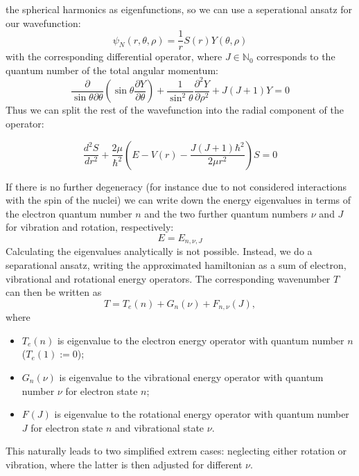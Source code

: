 the spherical harmonics as eigenfunctions, so we can use a 
seperational ansatz for our wavefunction:
\begin{equation}
    \psi_N(r,\theta,\rho) = \frac{1}{r} S(r)Y(\theta,\rho)
\end{equation}
with the corresponding
differential operator, where $J\in \mathbb{N}_0$
corresponds to the quantum number of the total angular momentum:
\begin{equation}
    \frac{\partial}{\sin\theta \partial \theta}\left (\sin\theta
    \frac{\partial Y}{\partial \theta}\right ) +
\frac{1}{\sin^2\theta} \frac{\partial^2 Y}{ \partial\rho^2}
 + J(J+1)Y = 0
\end{equation}
Thus we can split the rest of the wavefunction into the 
radial component of the operator:

\begin{equation}
    \frac{d^2 S}{dr^2} + \frac{2\mu}{\hbar^2}
    \left ( E - V(r) - \frac{J(J+1)\hbar^2}{2\mu r^2} \right ) S =0 
    \label{eqn:rad_schr}
\end{equation}

If there is no further degeneracy (for instance due to not
considered interactions with the spin of the nuclei) 
we can write down the energy eigenvalues in terms of the 
electron quantum number $n$ and the two further quantum numbers 
$\nu$ and $J$ for vibration and rotation, respectively:
\begin{equation}
    E = E_{n, \nu, J}
\end{equation}
Calculating the eigenvalues analytically is not possible. 
Instead, we do a separational ansatz, writing the approximated hamiltonian 
as a sum of electron, vibrational and rotational energy operators. 
The corresponding wavenumber 
$T$ can then be written as 
    \begin{equation}
    T = T_e(n) + G_n(\nu) + F_{n, \nu}(J), 
    \end{equation}
    where
    \begin{itemize}
    \item $T_e(n)$ is eigenvalue to the electron energy operator 
        with quantum number $n$ ($T_e(1) := 0$);
    \item $G_n(\nu)$ is eigenvalue to the vibrational energy operator 
        with quantum number $\nu$
        for electron state $n$;
    \item $F_{}(J)$ is eigenvalue to the rotational energy operator
        with quantum number $J$
        for electron state $n$ and vibrational state $\nu$.
    \end{itemize} 
This naturally leads to two simplified extrem cases: neglecting either rotation or 
vibration, where the latter is then adjusted for different $\nu$. 


